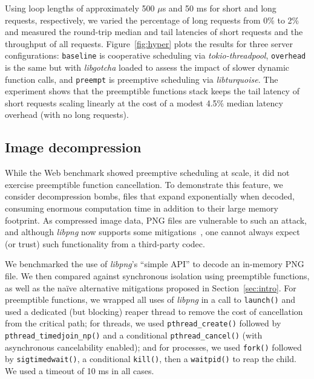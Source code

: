 Using loop lengths of approximately 500 $\mu$s and 50 ms for short and long requests,
respectively,
we varied the percentage of long requests from 0\% to 2\% and measured the round-trip
median and tail latencies of short requests and the throughput of all requests.
Figure~\ref{fig:hyper} plots the results for three server configurations:\@
\texttt{baseline} is cooperative scheduling via \textit{tokio-threadpool},
\texttt{overhead} is the same but with \textit{libgotcha} loaded to assess the
impact of slower dynamic function calls, and \texttt{preempt} is preemptive
scheduling via \textit{libturquoise}.  The experiment shows that the preemptible
functions stack keeps the tail latency of short requests scaling linearly at the cost
of a
modest 4.5\% median latency overhead (with no long requests).



\subsection{Image decompression}

While the Web benchmark showed preemptive scheduling at scale, it did not exercise
preemptible function cancellation.  To demonstrate this feature, we consider
decompression bombs, files that expand exponentially when decoded, consuming enormous
computation time in addition to their large memory footprint.  As compressed image
data, PNG files are vulnerable to such an attack, and although \textit{libpng} now
supports some mitigations~\cite{www-libpng-bombs}, one cannot always expect (or
trust) such functionality from a third-party codec.

We benchmarked the use of \textit{libpng}'s ``simple API'' to decode an in-memory PNG
file.  We then compared against synchronous isolation using preemptible functions, as
well as the na\"ive alternative mitigations proposed in Section~\ref{sec:intro}.  For
preemptible functions, we wrapped all uses of \textit{libpng} in a call to
\texttt{launch()} and used a dedicated (but blocking) reaper thread to remove the
cost of cancellation from the critical path; for threads, we used
\texttt{pthread\_create()} followed by \texttt{pthread\_timedjoin\_np()} and a
conditional \texttt{pthread\_cancel()} (with asynchronous cancelability enabled); and
for processes, we used \texttt{fork()} followed by \texttt{sigtimedwait()}, a
conditional \texttt{kill()}, then a \texttt{waitpid()} to reap the child.  We used a
timeout of 10 ms in all cases.

